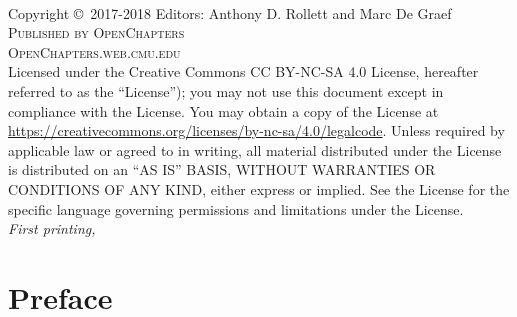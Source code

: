 \newpage
~\vfill
\thispagestyle{empty}

\noindent Copyright \copyright\ 2017-2018 Editors: Anthony D. Rollett and Marc De Graef\\ %

\noindent \textsc{Published by OpenChapters}\\ %

\noindent \textsc{OpenChapters.web.cmu.edu}\\ %

\noindent Licensed under the Creative Commons CC BY-NC-SA 4.0 License, hereafter referred to as the ``License''); you may not
use this document except in compliance with the License. You may obtain a copy
of the License at \url{https://creativecommons.org/licenses/by-nc-sa/4.0/legalcode}. Unless
required by applicable law or agreed to in writing, all material distributed
under the License is distributed on an ``AS IS'' BASIS, WITHOUT
WARRANTIES OR CONDITIONS OF ANY KIND, either express or implied. See the
License for the specific language governing permissions and limitations
under the License.\\ %

\noindent \textit{First printing, \monthyear} %


\pagestyle{empty} %
\tableofcontents %
\cleardoublepage %
\pagestyle{fancy} %

%
%



\cleardoublepage
{} %

\chapter*{Preface}

